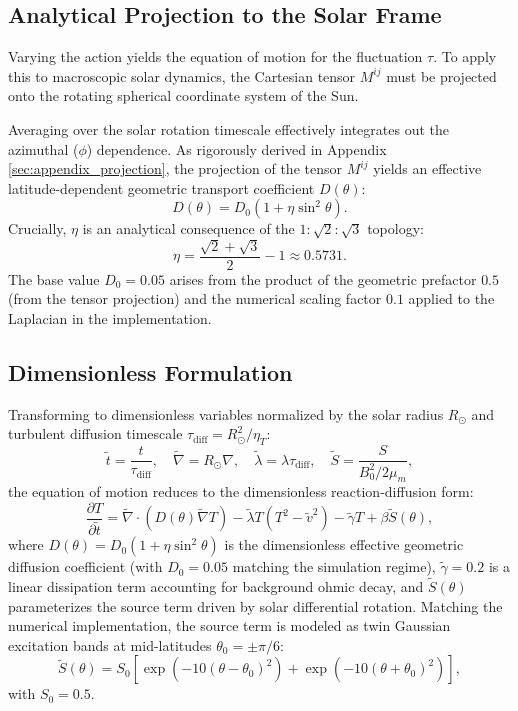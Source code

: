 \documentclass[aps, prd, onecolumn, 11pt, longbibliography, amsmath, amssymb]{revtex4-2}
\begin{document}
\subsection{Analytical Projection to the Solar Frame}

Varying the action yields the equation of motion for the fluctuation $\tau$. To apply this to macroscopic solar dynamics, the Cartesian tensor $M^{ij}$ must be projected onto the rotating spherical coordinate system of the Sun.

Averaging over the solar rotation timescale effectively integrates out the azimuthal ($\phi$) dependence. As rigorously derived in Appendix \ref{sec:appendix_projection}, the projection of the tensor $M^{ij}$ yields an effective latitude-dependent geometric transport coefficient $D(\theta)$:
\begin{equation}
D(\theta) = D_0(1 + \eta \sin^2\theta).
\label{eq:mu_theta}
\end{equation}
Crucially, $\eta$ is an analytical consequence of the $1:\sqrt{2}:\sqrt{3}$ topology:
\begin{equation}
\eta = \frac{\sqrt{2} + \sqrt{3}}{2} - 1 \approx 0.5731.
\end{equation}
The base value $D_0 = 0.05$ arises from the product of the geometric prefactor $0.5$ (from the tensor projection) and the numerical scaling factor $0.1$ applied to the Laplacian in the implementation.

\subsection{Dimensionless Formulation}

Transforming to dimensionless variables normalized by the solar radius $R_\odot$ and turbulent diffusion timescale $\tau_{\mathrm{diff}} = R_\odot^2/\eta_T$:
\begin{equation}
\tilde{t} = \frac{t}{\tau_{\mathrm{diff}}}, \quad 
\tilde{\nabla} = R_\odot \nabla, \quad 
\tilde{\lambda} = \lambda \tau_{\mathrm{diff}}, \quad 
\tilde{S} = \frac{S}{B_0^2/2\mu_m},
\end{equation}
the equation of motion reduces to the dimensionless reaction-diffusion form:
\begin{equation}
\frac{\partial T}{\partial \tilde{t}} = 
\tilde{\nabla} \cdot \left( D(\theta) \tilde{\nabla} T \right) 
- \tilde{\lambda} T(T^2 - \tilde{v}^2) - \tilde{\gamma} T + \beta \tilde{S}(\theta),
\label{eq:reaction_diffusion}
\end{equation}
where $D(\theta) = D_0(1 + \eta \sin^2\theta)$ is the dimensionless effective geometric diffusion coefficient (with $D_0 = 0.05$ matching the simulation regime), $\tilde{\gamma} = 0.2$ is a linear dissipation term accounting for background ohmic decay, and $\tilde{S}(\theta)$ parameterizes the source term driven by solar differential rotation. Matching the numerical implementation, the source term is modeled as twin Gaussian excitation bands at mid-latitudes $\theta_0 = \pm \pi/6$:
\begin{equation}
\tilde{S}(\theta) = S_0 \left[ \exp\left(-10(\theta - \theta_0)^2\right) + \exp\left(-10(\theta + \theta_0)^2\right) \right],
\end{equation}
with $S_0 = 0.5$.
\end{document}
